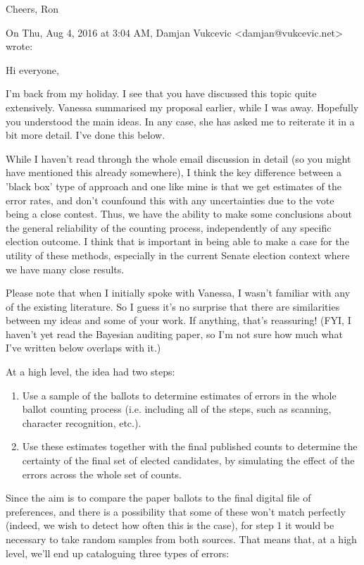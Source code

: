 \documentclass[10pt,a4paper]{article}
\begin{document}
Cheers,
Ron



On Thu, Aug 4, 2016 at 3:04 AM, Damjan Vukcevic <damjan@vukcevic.net> wrote:


    Hi everyone,

    I'm back from my holiday.  I see that you have discussed this topic quite extensively.  Vanessa summarised my proposal earlier, while I was away.  Hopefully you understood the main ideas.  In any case, she has asked me to reiterate it in a bit more detail.  I've done this below.

    While I haven't read through the whole email discussion in detail (so you might have mentioned this already somewhere), I think the key difference between a 'black box' type of approach and one like mine is that we get estimates of the error rates, and don't counfound this with any uncertainties due to the vote being a close contest.  Thus, we have the ability to make some conclusions about the general reliability of the counting process, independently of any specific election outcome.  I think that is important in being able to make a case for the utility of these methods, especially in the current Senate election context where we have many close results.

    Please note that when I initially spoke with Vanessa, I wasn't familiar with any of the existing literature.  So I guess it's no surprise that there are similarities between my ideas and some of your work.  If anything, that's reassuring!  (FYI, I haven't yet read the Bayesian auditing paper, so I'm not sure how much what I've written below overlaps with it.)



    At a high level, the idea had two steps:

\begin{enumerate}
\item Use a sample of the ballots to determine estimates of errors in the whole ballot counting process (i.e. including all of the steps, such as scanning, character recognition, etc.).  \label{sample}

\item Use these estimates together with the final published counts to determine the certainty of the final set of elected candidates, by simulating the effect of the errors across the whole set of counts.  \label{useEstimates}
\end{enumerate}


    Since the aim is to compare the paper ballots to the final digital file of preferences, and there is a possibility that some of these won't match perfectly (indeed, we wish to detect how often this is the case), for step 1 it would be necessary to take random samples from both sources.  That means that, at a high level, we'll end up cataloguing three types of errors:
\end{document}
